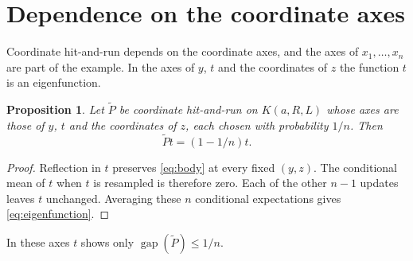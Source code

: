 \documentclass[11pt]{amsart}
\newtheorem{proposition}[theorem]{Proposition}
\theoremstyle{remark}
\numberwithin{equation}{section}
\newcommand{\gap}{\operatorname{gap}}
\begin{document}
\section{Dependence on the coordinate axes}\label{sec:coordinates}
Coordinate hit-and-run depends on the coordinate axes, and the axes of
$x_1,\ldots,x_n$ are part of the example. In the axes of $y$, $t$ and the
coordinates of $z$ the function $t$ is an eigenfunction.

\begin{proposition}\label{prop:unrotated}
Let $\widetilde P$ be coordinate hit-and-run on $K(a,R,L)$ whose axes are
those of $y$, $t$ and the coordinates of $z$, each chosen with
probability $1/n$. Then
\begin{equation}\label{eq:eigenfunction}
 \widetilde P t=(1-1/n)t.
\end{equation}
\end{proposition}
\begin{proof}
Reflection in $t$ preserves \eqref{eq:body} at every fixed $(y,z)$.
The conditional mean of $t$ when $t$ is resampled is therefore zero.
Each of the other $n-1$ updates leaves $t$ unchanged. Averaging these
$n$ conditional expectations gives \eqref{eq:eigenfunction}.
\end{proof}

In these axes $t$ shows only $\gap(\widetilde P)\le1/n$.
\end{document}
